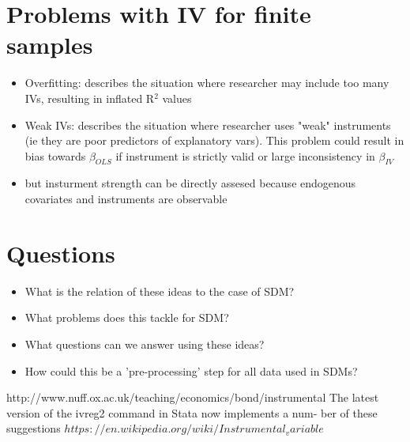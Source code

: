 \documentclass{article}
\begin{document}
\section{Problems with IV for finite samples}
  \begin{itemize}
  \item Overfitting: describes the situation where researcher may include too many IVs, resulting in inflated R$^{2}$ values 
  \item Weak IVs: describes the situation where researcher uses "weak" instruments (ie they are poor predictors of explanatory vars). This problem could result in bias towards $\beta_{OLS}$ if instrument is strictly valid or large inconsistency in $\beta_{IV}$
  \item but insturment strength can be directly assesed because endogenous covariates and instruments are observable
  \end{itemize}
  
\section{Questions}
 \begin{itemize}
  \item What is the relation of these ideas to the case of SDM?
  \item What problems does this tackle for SDM?
  \item What questions can we answer using these ideas?
  \item How could this be a 'pre-processing' step for all data used in SDMs?
  \end{itemize}
  
\begin{thebibliography}{1}
 http://www.nuff.ox.ac.uk/teaching/economics/bond/instrumental%
The latest version of the ivreg2 command in Stata now implements a num-
ber of these suggestions
 $https://en.wikipedia.org/wiki/Instrumental_variable$
\end{thebibliography}
\end{document}
